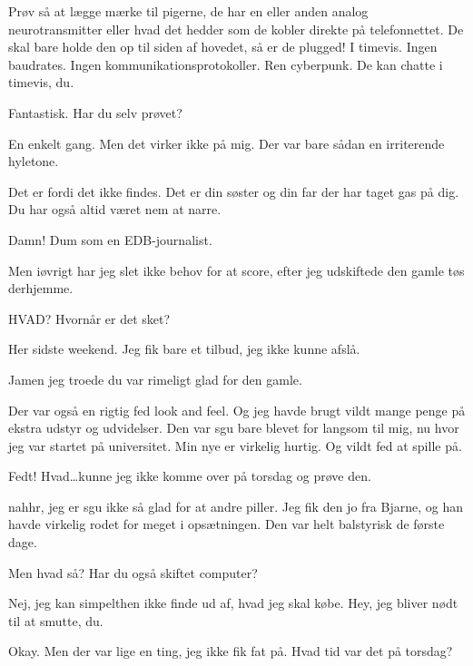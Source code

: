 \documentclass[danish]{article}
\begin{document}
\begin{sketch}
 Prøv så at lægge mærke til pigerne, de har en eller
anden analog neurotransmitter eller hvad det hedder som de kobler direkte
på telefonnettet. De skal bare holde den op til siden af hovedet, så er de
plugged! I timevis. Ingen baudrates. Ingen kommunikationsprotokoller. Ren
cyberpunk. De kan chatte i timevis, du.

 Fantastisk. Har du selv prøvet?

 En enkelt gang. Men det virker ikke på mig. Der var
bare sådan en irriterende hyletone.

 Det er fordi det ikke findes. Det er din søster og din
far der har taget gas på dig. Du har også altid været nem at narre.

 Damn! Dum som en EDB-journalist.

 Men iøvrigt har jeg slet ikke behov for at score, efter
jeg udskiftede den gamle tøs derhjemme.

 HVAD? Hvornår er det sket?

 Her sidste weekend. Jeg fik bare et tilbud, jeg ikke
kunne afslå.

 Jamen jeg troede du var rimeligt glad for den gamle.

 Der var også en rigtig fed look and feel. Og jeg havde
brugt vildt mange penge på ekstra udstyr og udvidelser. Den var sgu bare
blevet for langsom til mig, nu hvor jeg var startet på universitet. Min nye
er virkelig hurtig. Og vildt fed at spille på.

 Fedt! Hvad\ldots kunne jeg ikke komme over på torsdag og
prøve den.

 nahhr, jeg er sgu ikke så glad for at andre piller. Jeg
fik den jo fra Bjarne, og han havde virkelig rodet for meget i opsætningen.
Den var helt balstyrisk de første dage.

 Men hvad så? Har du også skiftet computer?

 Nej, jeg kan simpelthen ikke finde ud af, hvad jeg skal
købe.  Hey, jeg bliver nødt til at smutte, du.

 Okay. Men der var lige en ting, jeg ikke fik fat på.
Hvad tid var det på torsdag?


\end{sketch}
\end{document}
